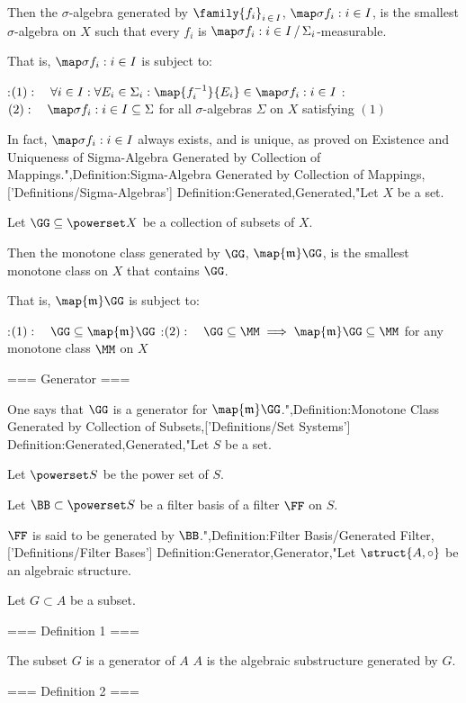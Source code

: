 Then the $\sigma$-algebra generated by $\family {f_i}_{i \mathop \in I}$, $\map \sigma {f_i: i \in I}$, is the smallest $\sigma$-algebra on $X$ such that every $f_i$ is $\map \sigma {f_i: i \in I} \, / \, \Sigma_i$-measurable.

That is, $\map \sigma {f_i: i \in I}$ is subject to:

:$(1):\quad \forall i \in I: \forall E_i \in \Sigma_i: \map {f_i^{-1} } {E_i} \in \map \sigma {f_i: i \in I}$
:$(2):\quad \map \sigma {f_i: i \in I} \subseteq \Sigma$ for all $\sigma$-algebras $\Sigma$ on $X$ satisfying $(1)$


In fact, $\map \sigma {f_i: i \in I}$ always exists, and is unique, as proved on Existence and Uniqueness of Sigma-Algebra Generated by Collection of Mappings.",Definition:Sigma-Algebra Generated by Collection of Mappings,['Definitions/Sigma-Algebras']
Definition:Generated,Generated,"Let $X$ be a set.

Let $\GG \subseteq \powerset X$ be a collection of subsets of $X$.


Then the monotone class generated by $\GG$, $\map {\mathfrak m} \GG$, is the smallest monotone class on $X$ that contains $\GG$.

That is, $\map {\mathfrak m} \GG$ is subject to:

:$(1): \quad \GG \subseteq \map {\mathfrak m} \GG$
:$(2): \quad \GG \subseteq \MM \implies \map {\mathfrak m} \GG \subseteq \MM$ for any monotone class $\MM$ on $X$


=== Generator ===

One says that $\GG$ is a generator for $\map {\mathfrak m} \GG$.",Definition:Monotone Class Generated by Collection of Subsets,['Definitions/Set Systems']
Definition:Generated,Generated,"Let $S$ be a set.

Let $\powerset S$ be the power set of $S$.

Let $\BB \subset \powerset S$ be a filter basis of a filter $\FF$ on $S$.


$\FF$ is said to be generated by $\BB$.",Definition:Filter Basis/Generated Filter,['Definitions/Filter Bases']
Definition:Generator,Generator,"Let $\struct {A, \circ}$ be an algebraic structure.

Let $G \subset A$ be a subset.


=== Definition 1 ===

The subset $G$ is a generator of $A$  $A$ is the algebraic substructure generated by $G$.


=== Definition 2 ===

